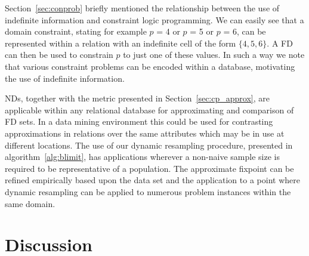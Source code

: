 \medskip

Section~\ref{sec:conprob} briefly mentioned the relationship between
the use of indefinite information and constraint logic programming. We
can easily see that a domain constraint, stating for example $p$ = 4
or $p$ = 5 or $p$ = 6, can be represented within a relation with an
indefinite cell of the form $\{ 4, 5, 6 \}$. A FD can then be used to
constrain $p$ to just one of these values. In such a way we note that
various constraint problems can be encoded within a database,
motivating the use of indefinite information.

\medskip
 
NDs, together with the metric presented in
Section~\ref{sec:cp_approx}, are applicable 
within any relational database for approximating and comparison of FD sets.
In a data mining environment this could be used for contrasting approximations
in relations over the same attributes which may be in use at different
locations. The use of our dynamic resampling procedure, presented in
algorithm~\ref{alg:blimit}, has applications wherever a non-naive
sample size is required to be representative of a population. The
approximate fixpoint can be refined empirically based upon the data
set and the application to a point where dynamic resampling can be
applied to numerous problem instances within the same domain.
 

\section{Discussion}\label{sec:cp_disc}


